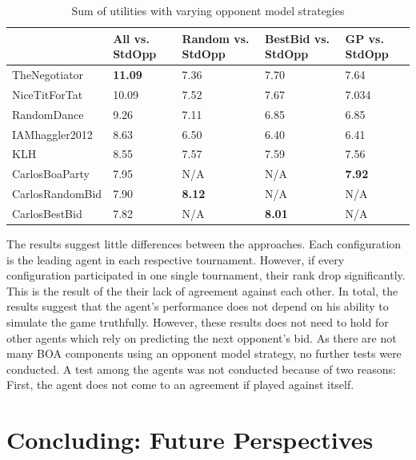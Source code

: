 \documentclass[a4paper,11pt]{article}
\theoremstyle{mytheor}
\begin{document}
\begin{table}[htb]
\centering
\begin{tabular}{l||llll}
\hline
                & All vs. StdOpp & Random vs. StdOpp  & BestBid vs. StdOpp & GP vs. StdOpp      \\ \hline\hline
TheNegotiator   & \textbf{11.09} & 7.36  & 7.70  & 7.64   \\ 
NiceTitForTat   & 10.09          & 7.52  & 7.67 & 7.034   \\ 
RandomDance     & 9.26           & 7.11  & 6.85 & 6.85 \\ 
IAMhaggler2012  & 8.63           & 6.50 & 6.40  & 6.41  \\ 
KLH             & 8.55           & 7.57  & 7.59  & 7.56   \\ 
CarlosBoaParty  & 7.95           & N/A     &    N/A   & \textbf{7.92}   \\ 
CarlosRandomBid & 7.90           & \textbf{8.12}  & N/A  &  N/A  \\ 
CarlosBestBid   & 7.82           &   N/A   & \textbf{8.01}  & N/A\\ \hline
\end{tabular}
\caption{Sum of utilities with varying opponent model strategies}
\end{table}

The results suggest little differences between the approaches. Each configuration is the leading agent in each respective tournament. However, if every configuration participated in one single tournament, their rank drop significantly. This is the result of the their lack of agreement against each other. In total, the results suggest that the agent's performance does not depend on his ability to simulate the game truthfully. However, these results does not need to hold for other agents which rely on predicting the next opponent's bid. As there are not many BOA components using an opponent model strategy, no further tests were conducted. A test among the agents was not conducted because of two reasons: First, the agent does not come to an agreement if played against itself. 

\section{Concluding: Future Perspectives}

\clearpage


\end{document}
